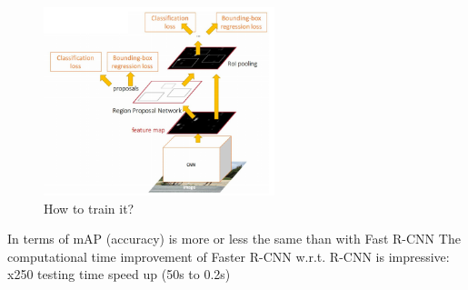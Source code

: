 \begin{figure}[h]
  \centering
  \includegraphics[width=0.6\textwidth]{Images/region_based_cnn/15.png}
  \caption{How to train it?}
\end{figure}

In terms of mAP (accuracy) is more or less the same than with Fast R-CNN
The computational time improvement of Faster R-CNN w.r.t. R-CNN is impressive: x250 testing time speed up (50s to 0.2s)

